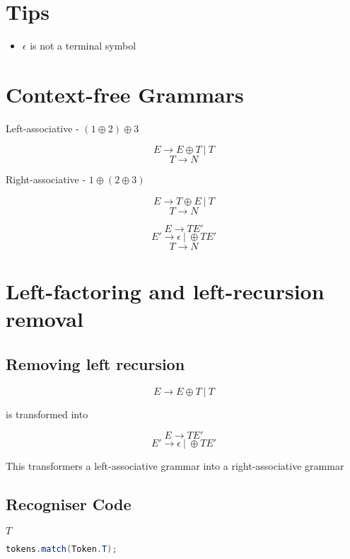 \documentclass[fontsize=10pt,a4paper]{article}
\begin{document}
\begin{multicols}{3}
    \small
    \section{Tips}

    \begin{itemize}
        \item $\epsilon$ is not a terminal symbol
    \end{itemize}

    \section{Context-free Grammars}

    Left-associative - $(1 \oplus 2) \oplus 3$

    \[E \rightarrow E \oplus T ~\vert~ T\]
    \[T \rightarrow N\]

    Right-associative - $1 \oplus (2 \oplus 3)$

    \[E \rightarrow T \oplus E ~\vert~ T\]
    \[T \rightarrow N\]

    \[E \rightarrow TE'\]
    \[E' \rightarrow \epsilon ~\vert~ \oplus TE'\]
    \[T \rightarrow N\]


    \section{Left-factoring and left-recursion removal}


    \subsection{Removing left recursion}

    \[E \rightarrow E \oplus T ~\vert~ T\]

    is transformed into

    \[E \rightarrow TE'\]
    \[E' \rightarrow \epsilon ~\vert~ \oplus TE'\]

    This transformers a left-associative grammar into a right-associative grammar

    \subsection{Recogniser Code}

    $T$
    \begin{lstlisting}[language=Java]
    tokens.match(Token.T);
    \end{lstlisting}


\end{multicols}
\end{document}
